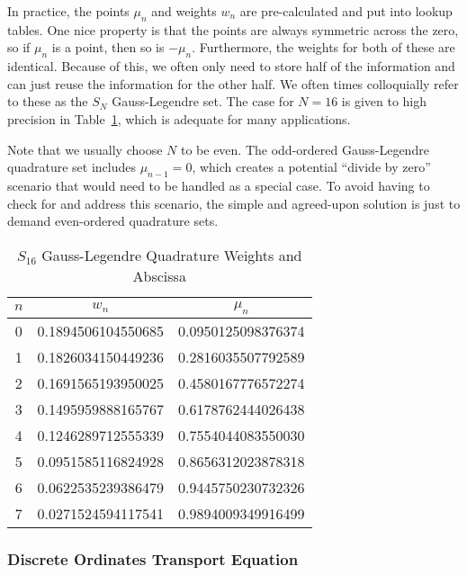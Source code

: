 In practice, the points $\mu_n$ and weights $w_n$ are pre-calculated and put into lookup tables. One nice property is that the points are always symmetric across the zero, so if $\mu_n$ is a point, then so is $-\mu_n$. Furthermore, the weights for both of these are identical. Because of this, we often only need to store half of the information and can just reuse the information for the other half. We often times colloquially refer to these as the $S_N$ Gauss-Legendre set. The case for $N = 16$ is given to high precision in Table~\ref{Table:neutronics_S16GaussLegendreQuadratureWeightsAbscissa}, which is adequate for many applications. 

Note that we usually choose $N$ to be even. The odd-ordered Gauss-Legendre quadrature set includes $\mu_{n-1} = 0$, which creates a potential ``divide by zero'' scenario that would need to be handled as a special case. To avoid having to check for and address this scenario, the simple and agreed-upon solution is just to demand even-ordered quadrature sets.

\begin{table}[tb!]
\caption{$S_{16}$ Gauss-Legendre Quadrature Weights and Abscissa}
\begin{center}
\begin{tabular}{|c|c|c|} \hline
$n$	& $w_n$					& $\mu_n$				\\ \hline
0	& 0.1894506104550685	& 0.0950125098376374	\\
1	& 0.1826034150449236	& 0.2816035507792589	\\
2	& 0.1691565193950025	& 0.4580167776572274	\\
3	& 0.1495959888165767	& 0.6178762444026438	\\
4	& 0.1246289712555339	& 0.7554044083550030	\\
5	& 0.0951585116824928	& 0.8656312023878318	\\
6	& 0.0622535239386479	& 0.9445750230732326	\\
7	& 0.0271524594117541	& 0.9894009349916499	\\ \hline
\end{tabular}
\end{center}
\label{Table:neutronics_S16GaussLegendreQuadratureWeightsAbscissa}
\end{table}%

\subsubsection{Discrete Ordinates Transport Equation}


